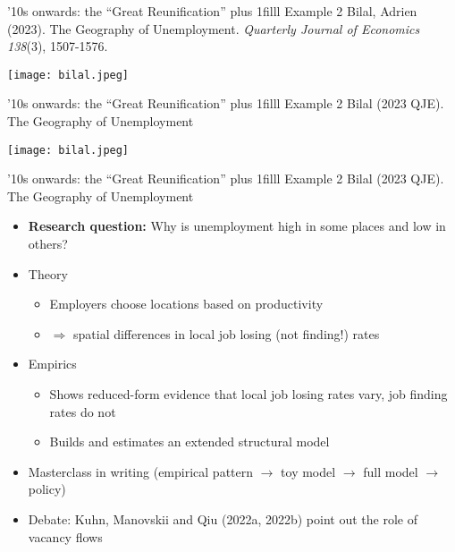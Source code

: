 \documentclass[aspectratio=169,compress,t,xcolor=table]{beamer}
\newcommand{\myhfill}[1]{\hskip0pt plus 1filll {\small #1}}
\begin{document}
\begin{frame}{'10s onwards: the ``Great Reunification'' \myhfill{Example 2}}
Bilal, Adrien (2023). The Geography of Unemployment. \textit{Quarterly Journal of Economics 138}(3), 1507-1576.
  \begin{center}
    \texttt{[image: bilal.jpeg]}
  \end{center}
\end{frame}
\addtocounter{framenumber}{-1}

\begin{frame}{'10s onwards: the ``Great Reunification'' \myhfill{Example 2}}
Bilal (2023 QJE). The Geography of Unemployment \\ \phantom{,ou}
  \begin{center}
    \texttt{[image: bilal.jpeg]}
  \end{center}
\end{frame}
\addtocounter{framenumber}{-1}

\begin{frame}{'10s onwards: the ``Great Reunification'' \myhfill{Example 2}}
Bilal (2023 QJE). The Geography of Unemployment
  \begin{itemize}
    \vfill\item {\color{MyStructure}\textbf{Research question:}} Why is unemployment high in some places and low in others?
    \vfill\item Theory
    \begin{itemize}
      \item Employers choose locations based on productivity
      \item \(\Rightarrow\) spatial differences in local job losing (not finding!) rates
    \end{itemize}
    \vfill\item Empirics
    \begin{itemize}
      \item Shows reduced-form evidence that local job losing rates vary, job finding rates do not
      \item Builds and estimates an extended structural model
    \end{itemize}

    \vfill\item Masterclass in writing (empirical pattern \(\rightarrow\) toy model \(\rightarrow\) full model \(\rightarrow\) policy)
    \item Debate: Kuhn, Manovskii and Qiu (2022a, 2022b) point out the role of vacancy flows
  \end{itemize}
\end{frame}
\end{document}
